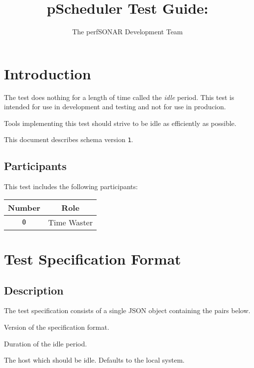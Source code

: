 \documentclass[10pt]{article}
\title{pScheduler Test Guide: {\it \testname}}
\author{The perfSONAR Development Team}
\begin{document}
\maketitle


%
%

\section{Introduction}

The {\tt \testname} test does nothing for a length of time called the
{\it idle} period.  This test is intended for use in development and
testing and not for use in producion.

Tools implementing this test should strive to be idle as efficiently
as possible.

This document describes schema version {\tt 1}.

\subsection{Participants}

This test includes the following participants:

\begin{center}
\begin{tabular}{|c|c|}
\hline
{\bf Number} & {\bf Role} \\
\hline
{\tt 0} & Time Waster \\
\hline
\end{tabular}
\end{center}



%
%

\section{Test Specification Format}

\subsection{Description}

The test specification consists of a single JSON object containing the
pairs below.  \seejson


 Version of the specification format.

 Duration of the idle period.

 The host which should be idle.  Defaults to the local system.
\end{document}
